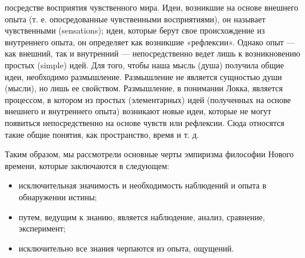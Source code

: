 \documentclass[12pt]{article}
\begin{document}
посредстве восприятия чувственного мира. Идеи, возникшие на основе внешнего опыта (т. е. опосредованные
чувственными восприятиями), он называет чувственными (sensations); идеи, которые берут свое происхождение
из  внутреннего  опыта,  он  определяет  как  возникшие  «рефлексии».  Однако  опыт  —  как  внешний,  так  и
внутренний — непосредственно ведет лишь к возникновению простых (simple) идей. Для того, чтобы наша
мысль (душа) получила общие идеи, необходимо размышление. Размышление не является сущностью души
(мысли), но лишь ее свойством.
Размышление,  в  понимании  Локка,  является  процессом,  в  котором  из  простых  (элементарных)  идей
(полученных на основе внешнего и внутреннего опыта) возникают новые идеи, которые не могут появиться
непосредственно на основе чувств или рефлексии. Сюда относятся такие общие понятия, как пространство,
время и т. д.

Таким образом, мы рассмотрели основные черты эмпиризма философии Нового времени, которые заключаются
в следующем:
\begin{itemize}
\item исключительная значимость и необходимость наблюдений и опыта в обнаружении истины;
\item путем, ведущим к знанию, является наблюдение, анализ, сравнение, эксперимент;
\item исключительно все знания черпаются из опыта, ощущений.
\end{itemize}

\newpage
\end{document}
